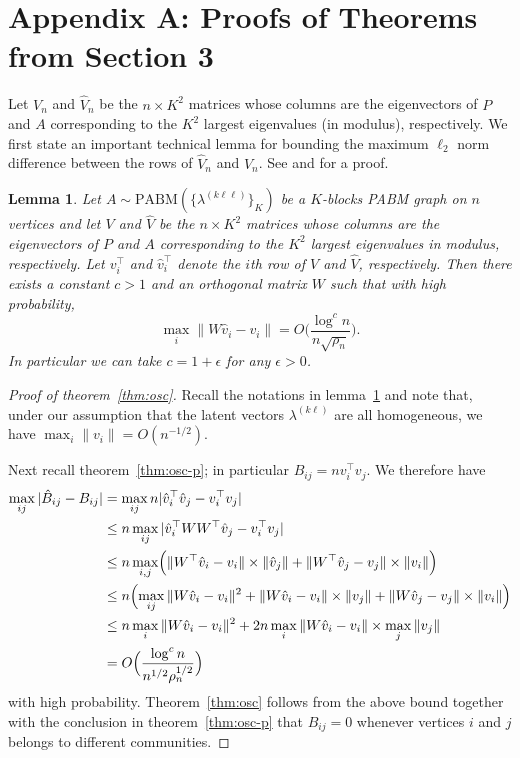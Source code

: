 \documentclass[
  12pt,
]{article}
\newtheorem{lemma}{Lemma}[section]
\theoremstyle{definition}
\theoremstyle{definition}
\theoremstyle{definition}
\theoremstyle{definition}
\theoremstyle{remark}
\begin{document}
\newpage

\section{Appendix A: Proofs of Theorems from Section 3}

Let \(V_n\) and \(\hat{V}_n\)
be the \(n \times K^2\) matrices whose columns are the eigenvectors of \(P\) and \(A\) corresponding to the
\(K^2\) largest eigenvalues (in modulus), respectively.
We first state an important technical lemma for bounding the maximum
\(\ell_2\) norm difference between the rows of \(\hat{V}_n\) and
\(V_n\). See \citet{cape_biometrika} and
\citet[Lemma~5]{rubindelanchy2017statistical} for a proof.

\begin{lemma}
\label{lem:technical}
Let $A \sim \mathrm{PABM}(\{\lambda^{(k \ell \ell)}\}_{K})$ be a $K$-blocks
PABM graph on $n$ vertices and let \(V\) and \(\hat{V}\)
be the $n \times K^2$ matrices whose columns are the eigenvectors of 
\(P\) and \(A\) corresponding to the
$K^2$ largest eigenvalues in modulus, respectively.
Let \(v_i^\top\) and \(\hat{v}_i^\top\) denote the $i$th 
row of \(V\) and \(\hat{V}\), respectively. 
Then there exists a constant $c > 1$ and an orthogonal matrix $W$ such
that with high probability,
$$\max_{i} \|W \hat{v}_i - v_i\|  = O\Big(\frac{\log^{c}n}{n \sqrt{\rho_n}} \Big).$$
In particular we can take $c = 1 + \epsilon$ for any $\epsilon > 0$. 
\end{lemma}

\begin{proof}[Proof of theorem~\ref{thm:osc}]
Recall the notations in lemma~\ref{lem:technical} and note that,
under our assumption that the latent vectors $\lambda^{(k \ell)}$
are all homogeneous, we have $\max_{i} \|v_i\| =
O(n^{-1/2})$. 

Next recall theorem~\ref{thm:osc-p}; in particular $B_{ij} = nv_i^{\top}
v_j$. 
We therefore have
\[\begin{split}
\max_{ij} |\hat{B}_{ij} - B_{ij}| &= \max_{ij} n |\hat{v}_i^\top \hat{v}_j -
v_i^\top v_j| \\
& \leq n \max_{ij} |\hat{v}_i^\top W W^\top \hat{v}_j -
v_i^\top v_j| \\
& \leq n \max_{i,j} \Bigl(\|W^{\top} \hat{v}_i - v_i\| \times \|\hat{v}_j\|
+ \|W^{\top} \hat{v}_j - v_j\| \times \|v_i\|\Bigr) \\
& \leq n \Bigl(\max_{ij}  \|W \hat{v}_i  - v_i \|^2 +  \|W
\hat{v}_i  - v_i \| \times \|v_j\| +  \|W \hat{v}_j  - v_j \| \times \|v_i\|\Bigr) 
\\ &
\leq n \max_{i} \|W \hat{v}_i  - v_i \|^2 + 2n \max_{i}
\|W \hat{v}_i  - v_i \| \times \max_{j} \|v_j\|
\\
& = O \Big( \frac{\log^{c}{n}}{n^{1/2} \rho_n^{1/2}} \Big)
\end{split}\]
with high probability.
Theorem~\ref{thm:osc} follows from the above bound together with the
conclusion in theorem~\ref{thm:osc-p} that $B_{ij} = 0$ whenever vertices $i$ and $j$
belongs to different communities. 
\end{proof}
\end{document}
